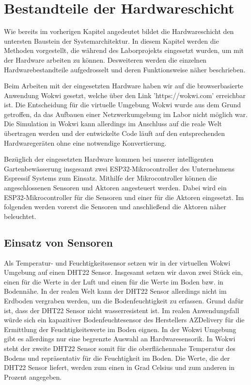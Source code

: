 
\section{Bestandteile der Hardwareschicht}

Wie bereits im vorherigen Kapitel angedeutet bildet die Hardwareschicht den untersten Baustein der Systemarchitektur. In diesem Kapitel werden die Methoden vorgestellt, die während des Laborprojekts eingesetzt wurden, um mit der Hardware arbeiten zu können. Desweiteren werden die einzelnen Hardwarebestandteile aufgedrosselt und deren Funktionsweise näher beschrieben.

Beim Arbeiten mit der eingesetzten Hardware haben wir auf die browserbasierte Anwendung Wokwi gesetzt, welche über den Link 'https://wokwi.com' erreichbar ist. Die Entscheidung für die virtuelle Umgebung Wokwi wurde aus dem Grund getroffen, da das Aufbauen einer Netzwerkumgebung im Labor nicht möglich war. Die Simulation in Wokwi kann allerdings im Anschluss auf die reale Welt übertragen werden und der entwickelte Code läuft auf den entsprechenden Hardwaregeräten ohne eine notwendige Konvertierung.

Bezüglich der eingesetzten Hardware kommen bei unserer intelligenten Gartenbewässerung insgesamt zwei ESP32-Mikrocontroller des Unternehmens Espressif Systems zum Einsatz. Mithilfe der Mikrocontroller können die angeschlossenen Sensoren und Aktoren angesteuert werden. Dabei wird ein ESP32-Mikrocontroller für die Sensoren und einer für die Aktoren eingesetzt. Im folgenden werden vorerst die Sensoren und anschließend die Aktoren näher beleuchtet.

\subsection{Einsatz von Sensoren}
Als Temperatur- und Feuchtigkeitssensor setzen wir in der virtuellen Wokwi Umgebung auf einen DHT22 Sensor. Insgesamt setzen wir davon zwei Stück ein, einen für die Werte in der Luft und einen für die Werte im Boden bzw. in Bodennähe. In der realen Welt kann der DHT22 Sensor allerdings nicht im Erdboden vergraben werden, um die Bodenfeuchtigkeit zu erfassen. Grund dafür ist, dass der DHT22 Sensor nicht wasserresistent ist. Im realen Anwendungsfall würde sich ein kapazitiver Bodenfeuchtesensor des Herstellers AZDelivery für die Ermittlung der Feuchtigkeitswerte im Boden eignen. In der Wokwi Umgebung gibt es allerdings nur eine begrenzte Auswahl an Hardwaresensorik. In Wokwi steht der zweite DHT22 Sensor somit für die oberflächennahe Temperatur des Bodens und repräsentativ für die Feuchtigkeit im Boden. Die Werte, die der DHT22 Sensor liefert, werden zum einen in Grad Celsius und zum anderen in Prozent angegeben.

